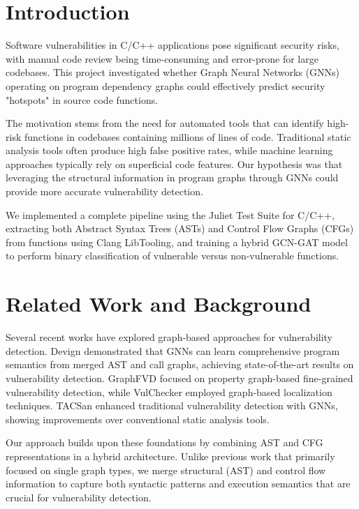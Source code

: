 \section{Introduction}

Software vulnerabilities in C/C++ applications pose significant security risks, with manual code review being time-consuming and error-prone for large codebases. This project investigated whether Graph Neural Networks (GNNs) operating on program dependency graphs could effectively predict security "hotspots" in source code functions.

The motivation stems from the need for automated tools that can identify high-risk functions in codebases containing millions of lines of code. Traditional static analysis tools often produce high false positive rates, while machine learning approaches typically rely on superficial code features. Our hypothesis was that leveraging the structural information in program graphs through GNNs could provide more accurate vulnerability detection.

We implemented a complete pipeline using the Juliet Test Suite for C/C++, extracting both Abstract Syntax Trees (ASTs) and Control Flow Graphs (CFGs) from functions using Clang LibTooling, and training a hybrid GCN-GAT model to perform binary classification of vulnerable versus non-vulnerable functions.

\section{Related Work and Background}

Several recent works have explored graph-based approaches for vulnerability detection. Devign \cite{devign} demonstrated that GNNs can learn comprehensive program semantics from merged AST and call graphs, achieving state-of-the-art results on vulnerability detection. GraphFVD \cite{graphfvd} focused on property graph-based fine-grained vulnerability detection, while VulChecker \cite{vulchecker} employed graph-based localization techniques. TACSan \cite{tacsan} enhanced traditional vulnerability detection with GNNs, showing improvements over conventional static analysis tools.

Our approach builds upon these foundations by combining AST and CFG representations in a hybrid architecture. Unlike previous work that primarily focused on single graph types, we merge structural (AST) and control flow information to capture both syntactic patterns and execution semantics that are crucial for vulnerability detection.

